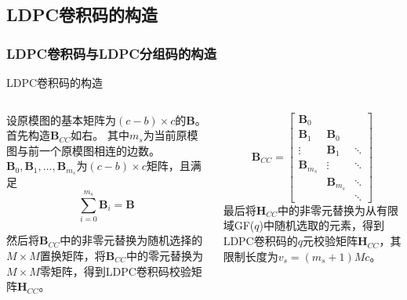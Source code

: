 \documentclass{beamer}
\begin{document}
\subsection{LDPC卷积码的构造}
\begin{frame}
    \frametitle{LDPC卷积码与LDPC分组码的构造}
        \begin{block}{LDPC卷积码的构造}
        \begin{columns}
        \begin{column}{0.5\textwidth}
        \footnotesize
设原模图的基本矩阵为$(c-b)\times c$的$\mathbf{B}$。
首先构造$\mathbf{B}_{CC}$如右。
其中$m_s$为当前原模图与前一个原模图相连的边数。$\mathbf{B}_0 , \mathbf{B}_1 , \dots , \mathbf{B}_{m_s}$为$(c-b)\times c$矩阵，且满足
\begin{equation*}
\sum^{m_s}_{i=0} \mathbf{B}_i = \mathbf{B}
\end{equation*}

然后将$\mathbf{B}_{CC}$中的非零元替换为随机选择的$M \times M$置换矩阵，将$\mathbf{B}_{CC}$中的零元替换为$M \times M$零矩阵，得到LDPC卷积码校验矩阵$\mathbf{H}_{CC}$。
\end{column}
\begin{column}{0.5\textwidth}
\footnotesize
\begin{equation*}
    \mathbf{B}_{CC} = \left[
          \begin{array}{ccc}
            \mathbf{B}_0& & \\
            \mathbf{B}_1 & \mathbf{B}_0 & \\
            \vdots & \mathbf{B}_1 & \ddots \\
            \mathbf{B}_{m_s} & \vdots & \ddots \\
             & \mathbf{B}_{m_s} & \ddots \\
             & & \ddots 
          \end{array} \right]
\end{equation*}
最后将$\mathbf{H}_{CC}$中的非零元替换为从有限域GF($q$)中随机选取的元素，得到LDPC卷积码的$q$元校验矩阵$\mathbf{H}_{CC}$，其限制长度为$v_s=(m_s+1)Mc$。
\end{column}
\end{columns}
        \end{block}
\end{frame}
\end{document}
